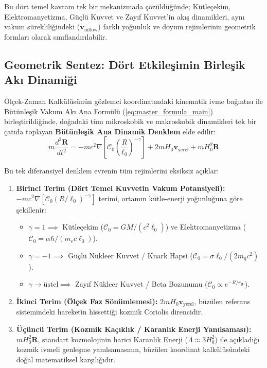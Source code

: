 Bu dört temel kavram tek bir mekanizmada çözüldüğünde; Kütleçekim, Elektromanyetizma, Güçlü Kuvvet ve Zayıf Kuvvet'in akış dinamikleri, aynı vakum sürekliliğindeki ($\mathbf{v}_{\mathrm{inflow}}$) farklı yoğunluk ve doyum rejimlerinin geometrik formları olarak sınıflandırılabilir.

\subsection{Geometrik Sentez: Dört Etkileşimin Birleşik Akı Dinamiği}
\label{sec:ana_dinamik_denklem_main}

Ölçek-Zaman Kalkülüsünün gözlemci koordinatındaki kinematik ivme bağıntısı ile Bütünleşik Vakum Akı Ana Formülü (\ref{eq:master_formula_main}) birleştirildiğinde, doğadaki tüm mikroskobik ve makroskobik dinamikleri tek bir çatıda toplayan \textbf{Bütünleşik Ana Dinamik Denklem} elde edilir:
\begin{equation}
    \boxed{ m \frac{d^2\mathbf{R}}{dt^2} = - m c^2 \nabla \left[ \mathcal{C}_0 \left(\frac{R}{\ell_0}\right)^{-\gamma} \right] + 2 m H_0 \mathbf{v}_{\mathrm{yerel}} + m H_0^2 \mathbf{R} }
    \label{eq:master_dynamic_equation}
\end{equation}

Bu tek diferansiyel denklem evrenin tüm rejimlerini eksiksiz açıklar:
\begin{enumerate}
    \item \textbf{Birinci Terim (Dört Temel Kuvvetin Vakum Potansiyeli):} $- m c^2 \nabla [\mathcal{C}_0 (R/\ell_0)^{-\gamma}]$ terimi, ortamın kütle-enerji yoğunluğuna göre şekillenir:
          \begin{itemize}
              \item $\gamma = 1 \implies$ Kütleçekim ($\mathcal{C}_0 = GM/(c^2 \ell_0)$) ve Elektromanyetizma ($\mathcal{C}_0 = \alpha \hbar / (m_e c \ell_0)$).
              \item $\gamma = -1 \implies$ Güçlü Nükleer Kuvvet / Kuark Hapsi ($\mathcal{C}_0 = \sigma \ell_0 / (2m_q c^2)$).
              \item $\gamma \to \text{üstel} \implies$ Zayıf Nükleer Kuvvet / Beta Bozunumu ($\mathcal{C}_0 \propto e^{-R/r_W}$).
          \end{itemize}
    \item \textbf{İkinci Terim (Ölçek Faz Sönümlemesi):} $2 m H_0 \mathbf{v}_{\mathrm{yerel}}$, büzülen referans sistemindeki hareketin hissettiği kozmik Coriolis direncidir.
    \item \textbf{Üçüncü Terim (Kozmik Kaçıklık / Karanlık Enerji Yanılsaması):} $m H_0^2 \mathbf{R}$, standart kozmolojinin harici Karanlık Enerji ($\Lambda \approx 3 H_0^2$) ile açıkladığı kozmik ivmeli genleşme yanılsamasının, büzülen koordinat kalkülüsündeki doğal matematiksel karşılığıdır.
\end{enumerate}

